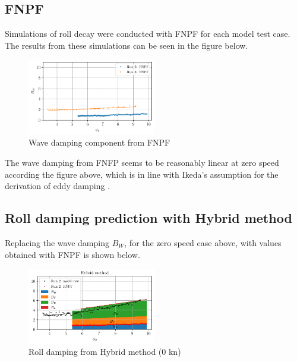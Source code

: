     \subsection{FNPF}\label{fnpf}

Simulations of roll decay were conducted with FNPF for each model test
case. The results from these simulations can be seen in the figure
below.

    \begin{figure}[H]
        \begin{center}\includegraphics[width = 0.5\textwidth]{figures/fnpf.pdf}\end{center}
        \vspace{-1cm}
        \caption{Wave damping component from FNPF}
        \label{fig:fnpf}
    \end{figure}
    
    The wave damping from FNFP seems to be reasonably linear at zero speed
according the figure above, which is in line with Ikeda's assumption for
the derivation of eddy damping \cite{7505983/4AFVVGNT}.

    \subsection{Roll damping prediction with Hybrid
method}\label{roll-damping-prediction-with-hybrid-method}
Replacing the wave damping $B_W$, for the zero speed case above, with values obtained with FNPF is shown below. 
    \begin{figure}[H]
        \begin{center}\includegraphics[width = 0.5\textwidth]{figures/hybrid_0.pdf}\end{center}
        \vspace{-1cm}
        \caption{Roll damping from Hybrid method (0 kn)}
        \label{fig:hybrid_0}
    \end{figure}
    

